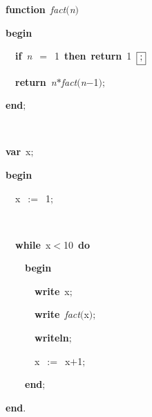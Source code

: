 
\fboxsep=0pt
\def\insert#1{$\fbox{#1}$}
\def\delete#1{$\fboxrule=.5mm\fbox{#1}$}
\rm
\ \par
\ \par
{\bf function}\ {\it fact}$(${\sl n}$)$\ \par
{\bf begin}\ \par
\ \ {\bf if}\ {\sl n}\ $=$\ 1\ {\bf then}\ {\bf return}\ 1\ \insert{$;$}\ \par
\ \ {\bf return}\ {\sl n}$*${\it fact}$(${\sl n}$-$1$)$$;$\ \par
{\bf end}$;$\ \par
\ \par
{\bf var}\ x$;$\ \par
{\bf begin}\ \par
\ \ x\ $:=$\ 1$;$\ \par
\ \par
\ \ {\bf while}\ x$<$10\ {\bf do}\ \par
\ \ \ \ {\bf begin}\ \par
\ \ \ \ \ \ {\bf write}\ x$;$\ \par
\ \ \ \ \ \ {\bf write}\ {\it fact}$($x$)$$;$\ \par
\ \ \ \ \ \ {\bf writeln}$;$\ \par
\ \ \ \ \ \ x\ $:=$\ x$+$1$;$\ \par
\ \ \ \ {\bf end}$;$\ \par
{\bf end}$.$

